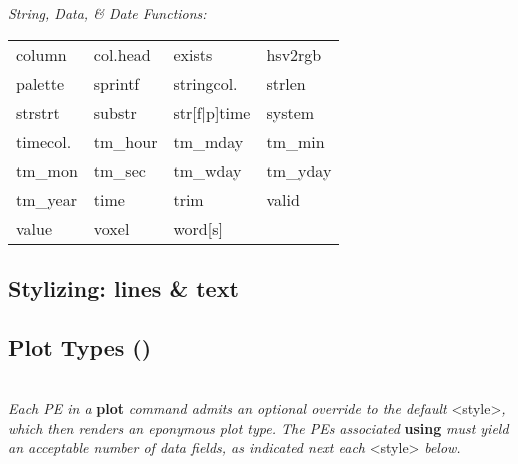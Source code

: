 \textit{String, Data, \& Date Functions:}\\
{\footnotesize
\begin{tabular}{l l l l}
    column          & col.head      & exists        & hsv2rgb       \\
    palette         & sprintf       & stringcol.    & strlen        \\
    strstrt         & substr        & str[f|p]time  & system        \\
    timecol.        & tm\_hour      & tm\_mday      & tm\_min       \\
    tm\_mon         & tm\_sec       & tm\_wday      & tm\_yday      \\
    tm\_year        & time          & trim          & valid         \\
    value           & voxel         & word[s]       \\
\end{tabular}}


\subsection*{Stylizing: lines \& text}


\subsection*{Plot Types ()}
\\
\textit{Each PE in a }\textbf{plot}\textit{ command admits an optional override to the default }<style>\textit{, which then renders an eponymous plot type. The PE\textquotesingle s associated }\textbf{using}\textit{ must yield an acceptable number of data fields, as indicated next each }<style>\textit{ below.}

